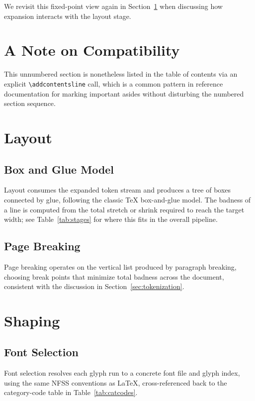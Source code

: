 \documentclass[11pt]{article}
\begin{document}
We revisit this fixed-point view again in Section~\ref{sec:layout} when
discussing how expansion interacts with the layout stage.

\section*{A Note on Compatibility}

This unnumbered section is nonetheless listed in the table of contents via
an explicit \texttt{\textbackslash addcontentsline} call, which is a common
pattern in reference documentation for marking important asides without
disturbing the numbered section sequence.

\section{Layout}
\label{sec:layout}

\subsection{Box and Glue Model}

Layout consumes the expanded token stream and produces a tree of boxes
connected by glue, following the classic TeX box-and-glue model. The
badness of a line is computed from the total stretch or shrink required to
reach the target width; see Table~\ref{tab:stages} for where this fits in
the overall pipeline.

\subsection{Page Breaking}

Page breaking operates on the vertical list produced by paragraph
breaking, choosing break points that minimize total badness across the
document, consistent with the discussion in Section~\ref{sec:tokenization}.

\section{Shaping}
\label{sec:shaping}

\subsection{Font Selection}

Font selection resolves each glyph run to a concrete font file and glyph
index, using the same NFSS conventions as \LaTeX{}, cross-referenced back
to the category-code table in Table~\ref{tab:catcodes}.
\end{document}
